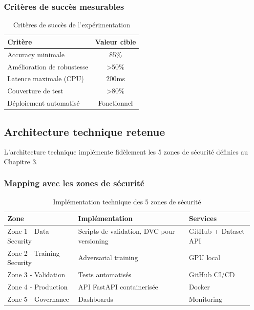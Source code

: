 \subsubsection{Critères de succès mesurables}

\begin{table}[h]
\centering
\caption{Critères de succès de l'expérimentation}
\label{tab:success_criteria}
\begin{tabular}{|l|c|}
\hline
\textbf{Critère} & \textbf{Valeur cible} \\ \hline
Accuracy minimale & 85\% \\ \hline
Amélioration de robustesse & >50\% \\ \hline
Latence maximale (CPU) & 200ms \\ \hline
Couverture de test & >80\% \\ \hline
Déploiement automatisé & Fonctionnel \\ \hline
\end{tabular}
\end{table}

\subsection{Architecture technique retenue}

L'architecture technique implémente fidèlement les 5 zones de sécurité définies au Chapitre 3.

\subsubsection{Mapping avec les zones de sécurité}

\begin{table}[h]
\centering
\caption{Implémentation technique des 5 zones de sécurité}
\label{tab:security_zones_mapping}
\small
\begin{tabular}{|l|p{5cm}|p{5cm}|}
\hline
\textbf{Zone} & \textbf{Implémentation} & \textbf{Services} \\ \hline
Zone 1 - Data Security &
Scripts de validation, DVC pour versioning &
GitHub + Dataset API \\ \hline
Zone 2 - Training Security &
Adversarial training &
GPU local \\ \hline
Zone 3 - Validation &
Tests automatisés &
GitHub CI/CD \\ \hline
Zone 4 - Production &
API FastAPI containerisée &
Docker \\ \hline
Zone 5 - Governance &
Dashboards &
Monitoring \\ \hline
\end{tabular}
\end{table}

